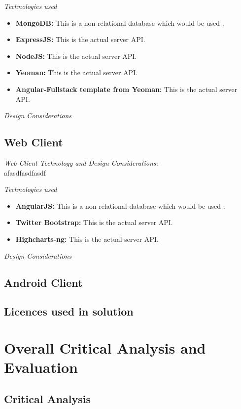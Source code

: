 \documentclass[12pt]{witseiepaper}
\begin{document}
\emph{Technologies used} 
\begin{itemize}
  \item \textbf{MongoDB:} This is a non relational database which would be used .
  \item \textbf{ExpressJS:} This is the actual server API.
  \item \textbf{NodeJS:} This is the actual server API.
  \item \textbf{Yeoman:} This is the actual server API.
  \item \textbf{Angular-Fullstack template from Yeoman:} This is the actual server API.
\end{itemize}

\emph{Design Considerations} 

\subsection{Web Client}
\textit{Web Client Technology and Design Considerations:} \\
afasdfasdfasdf

\emph{Technologies used} 
\begin{itemize}
	\item \textbf{AngularJS:} This is a non relational database which would be used .
	\item \textbf{Twitter Bootstrap:} This is the actual server API.
	\item \textbf{Highcharts-ng:} This is the actual server API.
\end{itemize}

\emph{Design Considerations} 

\subsection{Android Client}

\subsection{Licences used in solution}
 

\section{Overall Critical Analysis and Evaluation}

\subsection{Critical Analysis}
\end{document}
